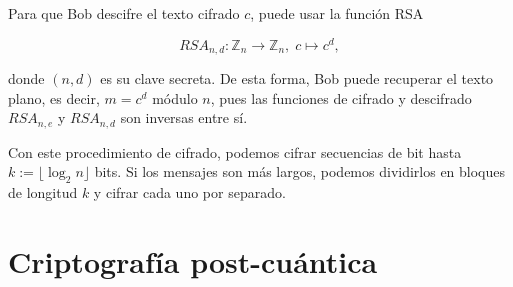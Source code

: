 Para que Bob descifre el texto cifrado $c$, puede usar la función RSA

$$RSA_{n, d} : \mathbb{Z}_n \longrightarrow \mathbb{Z}_n, \; c \longmapsto c^d,$$

donde $(n, d)$ es su clave secreta. De esta forma, Bob puede recuperar el texto plano, es decir, $m = c^d$ módulo $n$, pues las funciones de cifrado y descifrado $RSA_{n, e}$ y $RSA_{n, d}$ son inversas entre sí.

Con este procedimiento de cifrado, podemos cifrar secuencias de bit hasta $k := \lfloor \log_2{n} \rfloor$ bits. Si los mensajes son más largos, podemos dividirlos en bloques de longitud $k$ y cifrar cada uno por separado.

\section{Criptografía post-cuántica}

